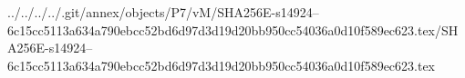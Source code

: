 ../../../../.git/annex/objects/P7/vM/SHA256E-s14924--6c15cc5113a634a790ebcc52bd6d97d3d19d20bb950cc54036a0d10f589ec623.tex/SHA256E-s14924--6c15cc5113a634a790ebcc52bd6d97d3d19d20bb950cc54036a0d10f589ec623.tex